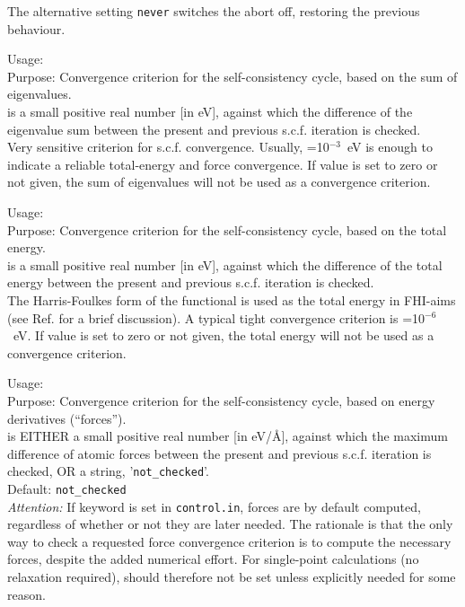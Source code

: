 The alternative setting  \texttt{never}
switches the abort off, restoring the previous behaviour.

{
  \noindent
  Usage:   \\[1.0ex]
  Purpose: Convergence criterion for the self-consistency cycle, based
    on the sum of eigenvalues. \\[1.0ex]
   is a small positive real number [in eV], against
  which the difference of the eigenvalue sum between the present and
  previous s.c.f. iteration is checked. \\
}
Very sensitive criterion for s.c.f. convergence. Usually,
=10$^{-3}$~eV is enough to indicate a
reliable total-energy and force convergence. If value is set to zero or
not given, the sum of eigenvalues will not be used as a convergence
criterion.

{
  \noindent
  Usage:   \\[1.0ex]
  Purpose: Convergence criterion for the self-consistency cycle, based
    on the total energy. \\[1.0ex]
   is a small positive real number [in eV], against
  which the difference of the total energy between the present and
  previous s.c.f. iteration is checked. \\
}
The Harris-Foulkes form of the functional is used as the total energy
in FHI-aims (see Ref. \cite{Blum08} for a brief discussion). A typical tight
convergence criterion is =10$^{-6}$~eV. If value is set
to zero or not given, the total energy will not be used as a
convergence criterion.

{
  \noindent
  Usage:   \\[1.0ex]
  Purpose: Convergence criterion for the self-consistency cycle, based
    on energy derivatives (``forces''). \\[1.0ex]
   is EITHER a small positive real number [in eV/{\AA}],
  against which the maximum difference of atomic forces between the
  present and previous s.c.f. iteration is checked, OR a string,
  '\texttt{not\_checked}'. \\[1.0ex]
  Default: \texttt{not\_checked} \\
}
\emph{Attention:} If keyword  is set in
\texttt{control.in}, forces are by default computed, regardless of
whether or not they are later needed. The rationale is that the only
way to check a requested force convergence criterion is to compute the
necessary forces, despite the added numerical effort. For single-point
calculations (no relaxation required), 
should therefore not be set unless explicitly needed for some reason.

